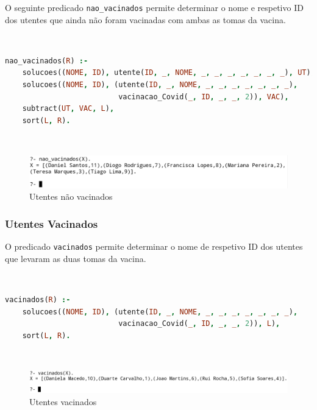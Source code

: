 \documentclass[a4paper, 11pt]{article}
\begin{document}
O seguinte predicado \texttt{nao\_vacinados} permite determinar o nome e respetivo ID dos utentes que ainda não foram
vacinadas com ambas as tomas da vacina.

\

\begin{lstlisting}[language=Prolog, caption={Extensão do predicado \texttt{nao\_vacinados}}]
% Extensao do predicado nao_vacinados: R -> {V, F}
nao_vacinados(R) :- 
    solucoes((NOME, ID), utente(ID, _, NOME, _, _, _, _, _, _, _), UT),
    solucoes((NOME, ID), (utente(ID, _, NOME, _, _, _, _, _, _, _),
                          vacinacao_Covid(_, ID, _, _, 2)), VAC),
    subtract(UT, VAC, L),
    sort(L, R).
\end{lstlisting}

\

\begin{figure}[H]
    \centering
    \includegraphics[width=.9\textwidth]{img/nao_vacinados.png}
    \caption{Utentes não vacinados}
\end{figure}

\subsubsection{Utentes Vacinados}

O predicado \texttt{vacinados} permite determinar o nome de respetivo ID dos utentes que levaram as duas tomas da vacina.

\

\begin{lstlisting}[language=Prolog, caption={Extensão do predicado \texttt{vacinados}}]
% Extensao do predicado vacinados: R -> {V, F}
vacinados(R) :- 
    solucoes((NOME, ID), (utente(ID, _, NOME, _, _, _, _, _, _, _),
                          vacinacao_Covid(_, ID, _, _, 2)), L),
    sort(L, R).
\end{lstlisting}

\

\begin{figure}[H]
    \centering
    \includegraphics[width=\textwidth]{img/vacinados.png}
    \caption{Utentes vacinados}
\end{figure}
\end{document}

